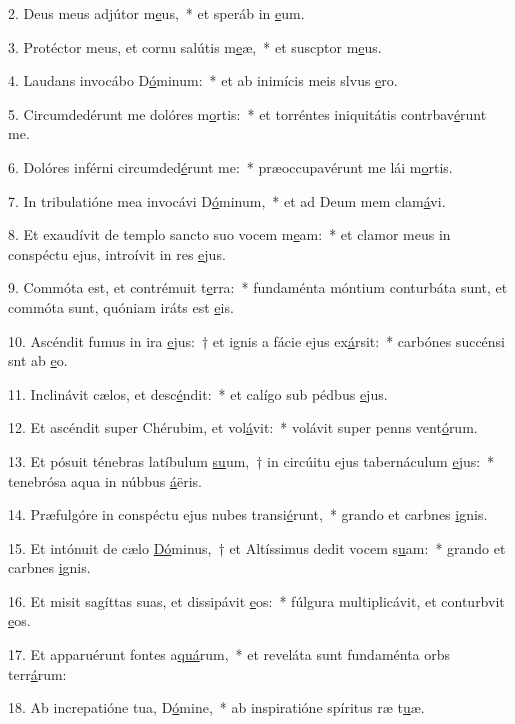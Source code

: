 2. Deus meus adjútor m\uline{e}us,~* et speráb in \uline{e}um.\par 
3. Protéctor meus, et cornu salútis m\uline{e}æ,~* et suscptor m\uline{e}us.\par 
4. Laudans invocábo D\uline{ó}minum:~* et ab inimícis meis slvus \uline{e}ro.\par 
5. Circumdedérunt me dolóres m\uline{o}rtis:~* et torréntes iniquitátis contrbav\uline{é}runt me.\par 
6. Dolóres inférni circumded\uline{é}runt me:~* præoccupavérunt me lái m\uline{o}rtis.\par 
7. In tribulatióne mea invocávi D\uline{ó}minum,~* et ad Deum mem clam\uline{á}vi.\par 
8. Et exaudívit de templo sancto suo vocem m\uline{e}am:~* et clamor meus in conspéctu ejus, introívit in res \uline{e}jus.\par 
9. Commóta est, et contrémuit t\uline{e}rra:~* fundaménta móntium conturbáta sunt, et commóta sunt, quóniam iráts est \uline{e}is.\par 
10. Ascéndit fumus in ira \uline{e}jus:~† et ignis a fácie ejus ex\uline{á}rsit:~* carbónes succénsi snt ab \uline{e}o.\par 
11. Inclinávit cælos, et desc\uline{é}ndit:~* et calígo sub pédbus \uline{e}jus.\par 
12. Et ascéndit super Chérubim, et vol\uline{á}vit:~* volávit super penns vent\uline{ó}rum.\par 
13. Et pósuit ténebras latíbulum \uline{su}um,~† in circúitu ejus tabernáculum \uline{e}jus:~* tenebrósa aqua in núbbus \uline{á}ëris.\par 
14. Præfulgóre in conspéctu ejus nubes transi\uline{é}runt,~* grando et carbnes \uline{i}gnis.\par 
15. Et intónuit de cælo \uline{Dó}minus,~† et Altíssimus dedit vocem s\uline{u}am:~* grando et carbnes \uline{i}gnis.\par 
16. Et misit sagíttas suas, et dissipávit \uline{e}os:~* fúlgura multiplicávit, et conturbvit \uline{e}os.\par 
17. Et apparuérunt fontes a\uline{quá}rum,~* et reveláta sunt fundaménta orbs terr\uline{á}rum:\par 
18. Ab increpatióne tua, D\uline{ó}mine,~* ab inspiratióne spíritus ræ t\uline{u}æ.\par 
